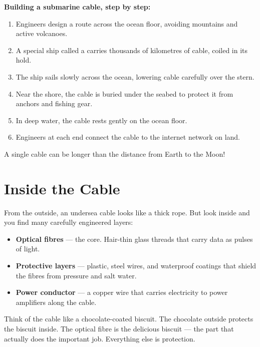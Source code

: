 \begin{quickmap}
  \textbf{Building a submarine cable, step by step:}
  \begin{enumerate}[label=\textbf{\arabic*.}]
    \item Engineers design a route across the ocean floor, avoiding mountains and active volcanoes.
    \item A special ship called a  carries thousands of kilometres of cable, coiled in its hold.
    \item The ship sails slowly across the ocean, lowering cable carefully over the stern.
    \item Near the shore, the cable is buried under the seabed to protect it from anchors and fishing gear.
    \item In deep water, the cable rests gently on the ocean floor.
    \item Engineers at each end connect the cable to the internet network on land.
  \end{enumerate}
\end{quickmap}

A single cable can be longer than the distance from Earth to the Moon!

\sectionrule

\section*{Inside the Cable}

From the outside, an undersea cable looks like a thick rope.
But look inside and you find many carefully engineered layers:

\begin{itemize}
  \item \textbf{Optical fibres} — the core. Hair-thin glass threads that carry data as pulses of light.
  \item \textbf{Protective layers} — plastic, steel wires, and waterproof coatings that shield the fibres from pressure and salt water.
  \item \textbf{Power conductor} — a copper wire that carries electricity to power amplifiers along the cable.
\end{itemize}

\begin{picturethis}
  Think of the cable like a chocolate-coated biscuit.
  The chocolate outside protects the biscuit inside.
  The optical fibre is the delicious biscuit —
  the part that actually does the important job.
  Everything else is protection.
\end{picturethis}

